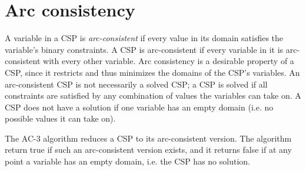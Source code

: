 \section{Arc consistency}\label{sec:arc-consistency}

A variable in a CSP is \emph{arc-consistent} if every value in its domain satisfies the variable's binary constraints.
A CSP is arc-consistent if every variable in it is arc-consistent with every other variable.
Arc consistency is a desirable property of a CSP, since it restricts and thus minimizes the domains of the CSP's variables.
An arc-consistent CSP is not necessarily a solved CSP; a CSP is solved if all constraints are satisfied by any combination of values the variables can take on.
A CSP does not have a solution if one variable has an empty domain (i.e. no possible values it can take on).

The AC-3 algorithm reduces a CSP to its arc-consistent version. The algorithm return true if such an arc-consistent version exists, and it returns false if at any point a variable has an empty domain, i.e. the CSP has no solution.
